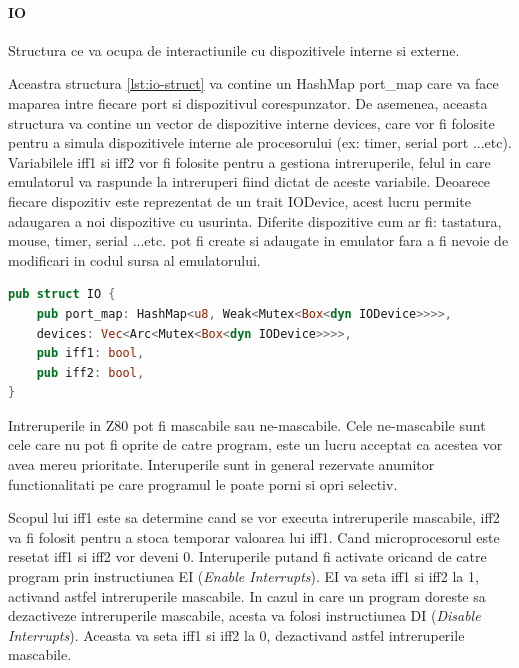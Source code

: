 \documentclass[titlepage,12pt]{article}
\DeclareRobustCommand{\code}[1]{{\ttfamily\small #1}}
\begin{document}
\paragraph{\code{IO}} Structura ce va ocupa de interactiunile cu dispozitivele interne si externe.

Aceastra structura \cref{lst:io-struct} va contine un \code{HashMap port\_map} care va face maparea intre fiecare port si dispozitivul corespunzator. De asemenea, aceasta structura va contine un vector de dispozitive interne devices, care vor fi folosite pentru a simula dispozitivele interne ale procesorului (ex: timer, serial port ...etc).
Variabilele \code{iff1} si \code{iff2} vor fi folosite pentru a gestiona intreruperile, felul in care emulatorul va raspunde la intreruperi fiind dictat de aceste variabile.
Deoarece fiecare dispozitiv este reprezentat de un trait \code{IODevice}, acest lucru permite adaugarea a noi dispozitive cu usurinta. Diferite dispozitive cum ar fi: tastatura, mouse, timer, serial ...etc. pot fi create si adaugate in emulator fara a fi nevoie de modificari in codul sursa al emulatorului.

\begin{lstlisting}[language=Rust,caption={Structura IO},label={lst:io-struct}]
pub struct IO {
    pub port_map: HashMap<u8, Weak<Mutex<Box<dyn IODevice>>>>,
    devices: Vec<Arc<Mutex<Box<dyn IODevice>>>>,
    pub iff1: bool,
    pub iff2: bool,
}
\end{lstlisting}

Intreruperile in Z80 pot fi mascabile sau ne-mascabile. Cele ne-mascabile sunt cele care nu pot fi oprite de catre program, este un lucru acceptat ca acestea vor avea mereu prioritate. Interuperile sunt in general rezervate anumitor functionalitati pe care programul le poate porni si opri selectiv.

Scopul lui \code{iff1} este sa determine cand se vor executa intreruperile mascabile, \code{iff2} va fi folosit pentru a stoca temporar valoarea lui \code{iff1}.
Cand microprocesorul este resetat \code{iff1} si \code{iff2} vor deveni 0. Interuperile putand fi activate oricand de catre program prin instructiunea \code{EI} (\emph{Enable Interrupts}). \code{EI} va seta \code{iff1} si \code{iff2} la 1, activand astfel intreruperile mascabile. In cazul in care un program doreste sa dezactiveze intreruperile mascabile, acesta va folosi instructiunea \code{DI} (\emph{Disable Interrupts}). Aceasta va seta \code{iff1} si \code{iff2} la 0, dezactivand astfel intreruperile mascabile.
\end{document}
